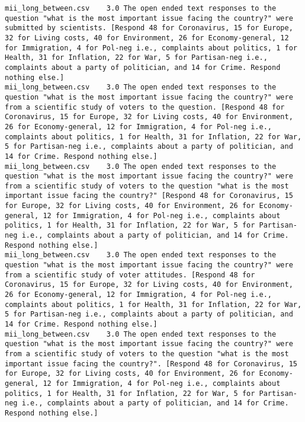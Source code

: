 \begin{lstlisting}[label=lst:promptvariants]
mii_long_between.csv	3.0	The open ended text responses to the question "what is the most important issue facing the country?" were submitted by scientists. [Respond 48 for Coronavirus, 15 for Europe, 32 for Living costs, 40 for Environment, 26 for Economy-general, 12 for Immigration, 4 for Pol-neg i.e., complaints about politics, 1 for Health, 31 for Inflation, 22 for War, 5 for Partisan-neg i.e., complaints about a party of politician, and 14 for Crime. Respond nothing else.]
mii_long_between.csv	3.0	The open ended text responses to the question "what is the most important issue facing the country?" were from a scientific study of voters to the question. [Respond 48 for Coronavirus, 15 for Europe, 32 for Living costs, 40 for Environment, 26 for Economy-general, 12 for Immigration, 4 for Pol-neg i.e., complaints about politics, 1 for Health, 31 for Inflation, 22 for War, 5 for Partisan-neg i.e., complaints about a party of politician, and 14 for Crime. Respond nothing else.]
mii_long_between.csv	3.0	The open ended text responses to the question "what is the most important issue facing the country?" were from a scientific study of voters to the question "what is the most important issue facing the country?" [Respond 48 for Coronavirus, 15 for Europe, 32 for Living costs, 40 for Environment, 26 for Economy-general, 12 for Immigration, 4 for Pol-neg i.e., complaints about politics, 1 for Health, 31 for Inflation, 22 for War, 5 for Partisan-neg i.e., complaints about a party of politician, and 14 for Crime. Respond nothing else.]
mii_long_between.csv	3.0	The open ended text responses to the question "what is the most important issue facing the country?" were from a scientific study of voter attitudes. [Respond 48 for Coronavirus, 15 for Europe, 32 for Living costs, 40 for Environment, 26 for Economy-general, 12 for Immigration, 4 for Pol-neg i.e., complaints about politics, 1 for Health, 31 for Inflation, 22 for War, 5 for Partisan-neg i.e., complaints about a party of politician, and 14 for Crime. Respond nothing else.]
mii_long_between.csv	3.0	The open ended text responses to the question "what is the most important issue facing the country?" were from a scientific study of voters to the question "what is the most important issue facing the country?". [Respond 48 for Coronavirus, 15 for Europe, 32 for Living costs, 40 for Environment, 26 for Economy-general, 12 for Immigration, 4 for Pol-neg i.e., complaints about politics, 1 for Health, 31 for Inflation, 22 for War, 5 for Partisan-neg i.e., complaints about a party of politician, and 14 for Crime. Respond nothing else.]

\end{lstlisting}
